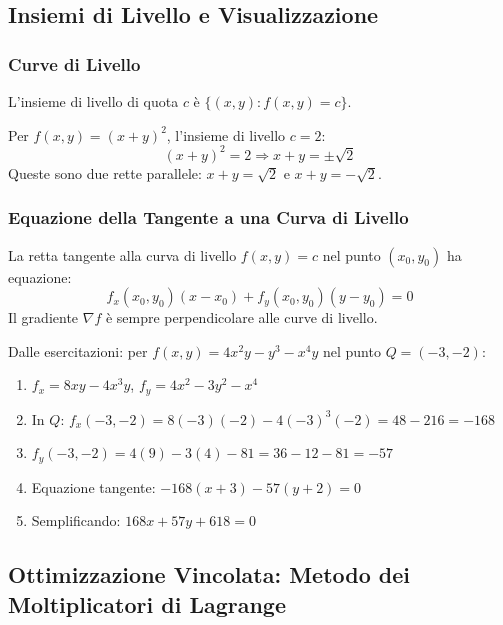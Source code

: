 \subsection{Insiemi di Livello e Visualizzazione}

\subsubsection{Curve di Livello}
L'insieme di livello di quota $c$ è $\{(x,y) : f(x,y) = c\}$.

\begin{esempio}
Per $f(x,y) = (x+y)^2$, l'insieme di livello $c = 2$:
\[ (x+y)^2 = 2 \Rightarrow x+y = \pm\sqrt{2} \]
Queste sono due rette parallele: $x+y = \sqrt{2}$ e $x+y = -\sqrt{2}$.
\end{esempio}

\subsubsection{Equazione della Tangente a una Curva di Livello}

\begin{info}
La retta tangente alla curva di livello $f(x,y) = c$ nel punto $(x_0,y_0)$ ha equazione:
\[ f_x(x_0,y_0)(x-x_0) + f_y(x_0,y_0)(y-y_0) = 0 \]
Il gradiente $\nabla f$ è sempre perpendicolare alle curve di livello.
\end{info}

\begin{esempio}
Dalle esercitazioni: per $f(x,y) = 4x^2 y - y^3 - x^4 y$ nel punto $Q=(-3,-2)$:

\begin{enumerate}
    \item $f_x = 8xy - 4x^3 y$, $f_y = 4x^2 - 3y^2 - x^4$
    \item In $Q$: $f_x(-3,-2) = 8(-3)(-2) - 4(-3)^3(-2) = 48 - 216 = -168$
    \item $f_y(-3,-2) = 4(9) - 3(4) - 81 = 36 - 12 - 81 = -57$
    \item Equazione tangente: $-168(x+3) - 57(y+2) = 0$
    \item Semplificando: $168x + 57y + 618 = 0$
\end{enumerate}
\end{esempio}

\subsection{Ottimizzazione Vincolata: Metodo dei Moltiplicatori di Lagrange}

